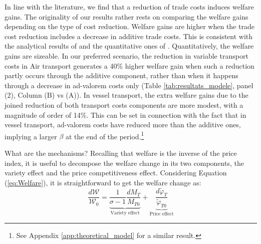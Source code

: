 \documentclass[a4paper,11pt]{article}
\begin{document}
In line with the literature, we find that a reduction of trade costs induces welfare gains.
The originality of our results rather rests on comparing the welfare gains depending on the type of cost reduction.
Welfare gains are higher when the trade cost reduction includes a decrease in additive trade costs.
This is consistent with the analytical results of \cite{sorensen2014} and the quantitative ones of \cite{Irrazabal_2015}.
Quantitatively, the welfare gains are sizeable. In our preferred scenario, the reduction in variable transport costs in Air transport generates a 40\% higher welfare gain  when such a reduction partly occurs through the additive component, rather than when it happens through a decrease in ad-valorem costs only (Table \ref{tab:resultats_modele}, panel (2), Column (B) vs (A)). In vessel transport, the extra welfare gains due to the joined reduction of both transport costs components are more modest, with a magnitude of order of 14\%. This can be set in connection with the fact that in vessel transport, ad-valorem costs have reduced more than the additive ones, implying a larger $\beta$ at the end of the period.\footnote{See Appendix \ref{app:theoretical_model} for a similar result.}
\smallskip

What are the mechanisms? Recalling that welfare is the inverse of the price index, it is useful to decompose the welfare change in its two components, the variety effect and the price competitiveness effect. Considering Equation (\ref{eq:Welfare}), it is straightforward to get the welfare change as:
\begin{equation}
\frac{d\mathcal{W}}{\mathcal{W}_0} = \underbrace{\frac{1}{\sigma-1} \frac{d M_T}{M_{T0}}}_{\text{Variety effect}} +  \underbrace{\frac{d\widetilde{\varphi}_T}{\widetilde{\varphi}_{T0}}}_{\text{Price effect}} \label{eq:decompWelfare}
\end{equation}
\end{document}
